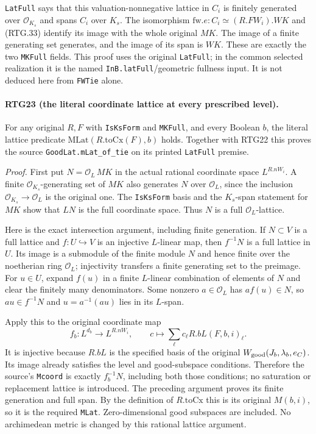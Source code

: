 \texttt{LatFull} says that this valuation-nonnegative lattice in $C_i$
is finitely generated over $\mathcal O_{K_s}$ and spans $C_i$ over
$K_s$.  The isomorphism $\mathrm{fw}.e:C_i\simeq(R.FW_i).WK$ and
(RTG.33) identify its image with the whole original $MK$.
The image of a finite generating set generates, and the image of its
span is $WK$.  These are exactly the two \texttt{MKFull} fields.
This proof uses the original \texttt{LatFull}; in the common selected
realization it is the named \texttt{InB.latFull}/geometric fullness
input.  It is not deduced here from \texttt{FWTie} alone.

\paragraph{RTG23 (the literal coordinate lattice at every prescribed level).}
\label{claim:RTG23}
For any original $R,F$ with \texttt{IsKsForm} and \texttt{MKFull},
and every Boolean $b$, the literal lattice predicate
\(\mathrm{MLat}(R.\mathrm{toCx}(F),b)\) holds.
Together with RTG22 this proves the source
\texttt{GoodLat.mLat\_\allowbreak of\_\allowbreak tie} on its printed \texttt{LatFull} premise.

\emph{Proof.}
First put $N=\mathcal O_L\,MK$ in the actual rational coordinate space
$L^{R.nW_i}$.  A finite $\mathcal O_{K_s}$-generating set of $MK$
also generates $N$ over $\mathcal O_L$, since the inclusion
$\mathcal O_{K_s}\to\mathcal O_L$ is the original one.
The \texttt{IsKsForm} basis and the $K_s$-span statement for $MK$
show that $LN$ is the full coordinate space.  Thus $N$ is a full
$\mathcal O_L$-lattice.

Here is the exact intersection argument, including finite generation.
If $N\subset V$ is a full lattice and $f:U\hookrightarrow V$ is an
injective $L$-linear map, then $f^{-1}N$ is a full lattice in $U$.
Its image is a submodule of the finite module $N$ and hence finite
over the noetherian ring $\mathcal O_L$; injectivity transfers a finite
generating set to the preimage.  For $u\in U$, expand $f(u)$ in a
finite $L$-linear combination of elements of $N$ and clear the finitely
many denominators.  Some nonzero $a\in\mathcal O_L$ has
$af(u)\in N$, so $au\in f^{-1}N$ and
$u=a^{-1}(au)$ lies in its $L$-span.

Apply this to the original coordinate map
\[
 f_b:L^{d_b}\longrightarrow L^{R.nW_i},\qquad
          c\longmapsto\sum_\ell c_\ell R.bL(F,b,i)_\ell.
                                                               \tag{RTG.34}
\]
It is injective because $R.bL$ is the specified basis of the original
$W_{\rm good}(J_b,\lambda_b,e_C)$.  Its image already satisfies the
level and good-subspace conditions.  Therefore the source's
\texttt{Mcoord} is exactly $f_b^{-1}N$, including both those conditions;
no saturation or replacement lattice is introduced.  The preceding
argument proves its finite generation and full span.  By the definition
of $R.\mathrm{toCx}$ this is its original $M(b,i)$, so it is the
required \texttt{MLat}.  Zero-dimensional good subspaces are included.
No archimedean metric is changed by this rational lattice argument.

